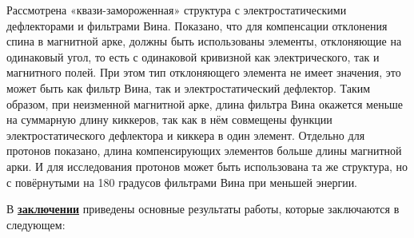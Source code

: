 \noindent Рассмотрена «квази-замороженная» структура с электростатическими дефлекторами и фильтрами Вина. Показано, что для компенсации отклонения спина в магнитной арке, должны быть использованы элементы, отклоняющие на одинаковый угол, то есть с одинаковой кривизной как электрического, так и магнитного полей. При этом тип отклоняющего элемента не имеет значения, это может быть как фильтр Вина, так и электростатический дефлектор. Таким образом, при неизменной магнитной арке, длина фильтра Вина окажется меньше на суммарную длину киккеров, так как в нём совмещены функции электростатического дефлектора и киккера в один элемент. Отдельно для протонов показано, длина компенсирующих элементов больше длины магнитной арки. И для исследования протонов может быть использована та же структура, но с повёрнутыми на 180 градусов фильтрами Вина при меньшей энергии. \cite{Kolokolchikov:2021trans}

\FloatBarrier
{}                                  %

В \underline{\textbf{заключении}} приведены основные результаты работы, которые заключаются в следующем:




